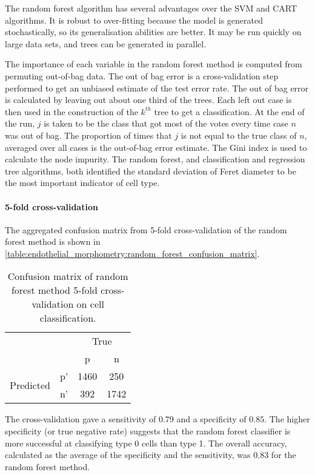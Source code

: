 The random forest algorithm has several advantages over the SVM and CART algorithms. It is robust to over-fitting because the model is generated stochastically, so its generalisation abilities are better. It may be run quickly on large data sets, and trees can be generated in parallel.

The importance of each variable in the random forest method is computed from permuting out-of-bag data. The out of bag error is a cross-validation step performed to get an unbiased estimate of the test error rate. The out of bag error is calculated by leaving out about one third of the trees. Each left out case is then used in the construction of the $k^{th}$ tree to get a classification. At the end of the run, $j$ is taken to be the class that got most of the votes every time case $n$ was out of bag. The proportion of times that $j$ is not equal to the true class of $n$, averaged over all cases is the out-of-bag error estimate. The Gini index is used to calculate the node impurity. The random forest, and classification and regression tree algorithms, both identified the standard deviation of Feret diameter to be the most important indicator of cell type.

\paragraph{5-fold cross-validation}
The aggregated confusion matrix from 5-fold cross-validation of the random forest method is shown in \autoref{table:endothelial_morphometry:random_forest_confusion_matrix}.
\begin{table}[htbp!]
\caption[Confusion matrix of random forest cross-validation on cell classification]{Confusion matrix of random forest method 5-fold cross-validation on cell classification.}
\label{table:endothelial_morphometry:random_forest_confusion_matrix}
\centering
\begin{tabular}{cc|cc}
	\multicolumn{2}{c}{}&\multicolumn{2}{c}{True}\\
	\multicolumn{2}{c|}{}& p & n\\
	\cline{2-4}
	\multirow{2}{*}{Predicted}& p' & 1460 & 250\\ & n' & 392 & 1742\\
\end{tabular}
\end{table}

The cross-validation gave a sensitivity of $0.79$ and a specificity of $0.85$. The higher specificity (or true negative rate) suggests that the random forest classifier is more successful at classifying type 0 cells than type 1. The overall accuracy, calculated as the average of the specificity and the sensitivity, was $0.83$ for the random forest method.

